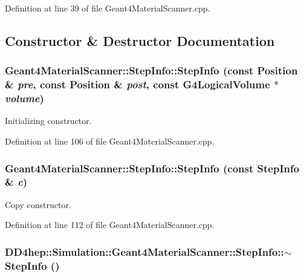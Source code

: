 Definition at line 39 of file Geant4MaterialScanner.cpp.

\subsection{Constructor \& Destructor Documentation}
\hypertarget{class_d_d4hep_1_1_simulation_1_1_geant4_material_scanner_1_1_step_info_a036a76d4b5c8de7d90d610417a7e2fa6}{
\subsubsection[{StepInfo}]{\setlength{\rightskip}{0pt plus 5cm}Geant4MaterialScanner::StepInfo::StepInfo (const {\bf Position} \& {\em pre}, \/  const {\bf Position} \& {\em post}, \/  const G4LogicalVolume $\ast$ {\em volume})}}
\label{class_d_d4hep_1_1_simulation_1_1_geant4_material_scanner_1_1_step_info_a036a76d4b5c8de7d90d610417a7e2fa6}


Initializing constructor. 

Definition at line 106 of file Geant4MaterialScanner.cpp.\hypertarget{class_d_d4hep_1_1_simulation_1_1_geant4_material_scanner_1_1_step_info_a378c8dfd8190c95fd6ceefe32cdb127f}{
\subsubsection[{StepInfo}]{\setlength{\rightskip}{0pt plus 5cm}Geant4MaterialScanner::StepInfo::StepInfo (const {\bf StepInfo} \& {\em c})}}
\label{class_d_d4hep_1_1_simulation_1_1_geant4_material_scanner_1_1_step_info_a378c8dfd8190c95fd6ceefe32cdb127f}


Copy constructor. 

Definition at line 112 of file Geant4MaterialScanner.cpp.\hypertarget{class_d_d4hep_1_1_simulation_1_1_geant4_material_scanner_1_1_step_info_a097ddb25fb641476ab568a192dc44531}{
\subsubsection[{$\sim$StepInfo}]{\setlength{\rightskip}{0pt plus 5cm}DD4hep::Simulation::Geant4MaterialScanner::StepInfo::$\sim$StepInfo ()}}
\label{class_d_d4hep_1_1_simulation_1_1_geant4_material_scanner_1_1_step_info_a097ddb25fb641476ab568a192dc44531}


